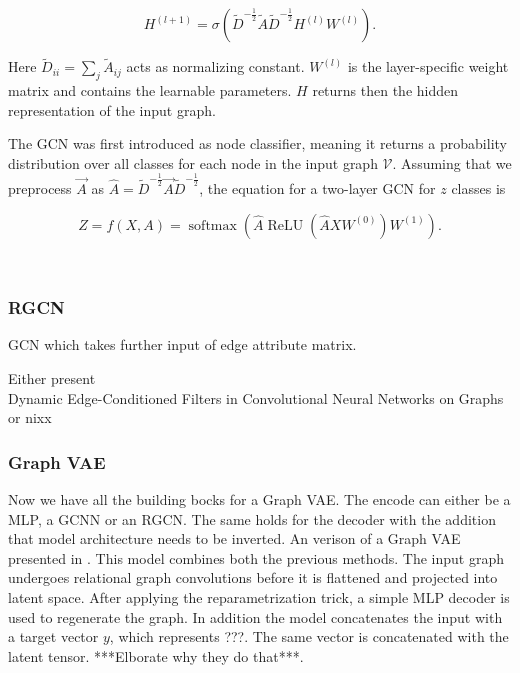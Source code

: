 \begin{equation}
    H^{(l+1)}=\sigma\left(\tilde{D}^{-\frac{1}{2}} \tilde{A} \tilde{D}^{-\frac{1}{2}} H^{(l)} W^{(l)}\right).
\end{equation}

Here $\tilde{D}_{i i}=\sum_{j} \tilde{A}_{i j}$ acts as normalizing constant. $W^{(l)}$ is the layer-specific weight matrix and contains the learnable parameters. $H$ returns then the hidden representation of the input graph.

The GCN was first introduced as node classifier, meaning it returns a probability distribution over all classes for each node in the input graph $\mathcal{V}$. Assuming that we preprocess $\vec{A}$ as $\hat{A}=\tilde{D}^{-\frac{1}{2}} \vec{A} \tilde{D}^{-\frac{1}{2}}$, the equation for a two-layer GCN for $z$ classes is

\begin{equation}
    Z=f(X, A)=\operatorname{softmax}\left(\hat{A} \operatorname{ReLU}\left(\hat{A} X W^{(0)}\right) W^{(1)}\right).
\end{equation}

\\
\subsubsection{RGCN}

GCN which takes further input of edge attribute matrix.

Either present\\
Dynamic Edge-Conditioned Filters in Convolutional Neural Networks on Graphs\\
or nixx
\\
\subsubsection{Graph VAE}

Now we have all the building bocks for a Graph VAE. The encode can either be a MLP, a GCNN or an RGCN. The same holds for the decoder with the addition that model architecture needs to be inverted. An verison of a Graph VAE presented in \cite{simonovsky_graphvae_2018}. This model combines both the previous methods. The input graph undergoes relational graph convolutions before it is flattened and projected into latent space. After applying the reparametrization trick, a simple MLP decoder is used to regenerate the graph. In addition the model concatenates the input with a target vector $y$, which represents ???. The same vector is concatenated with the latent tensor. ***Elborate why they do that***.

